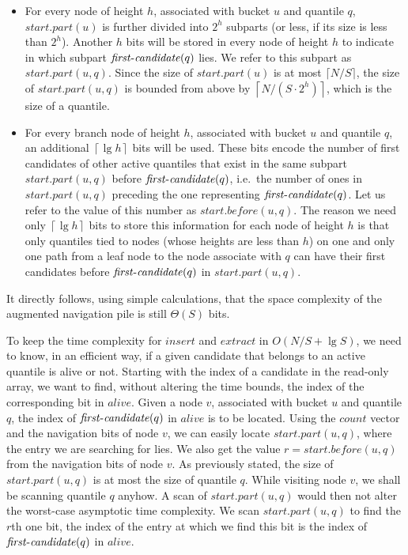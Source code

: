 \documentclass[final,onetabnum,onefignum,onethmnum]{siamltex}
\newcommand{\Insert}{\mbox{$\mathit{insert}$}}
\newcommand{\Extract}{\mbox{$\mathit{extract}$}}
\newcommand{\ceils}[1]{\left\lceil #1 \right\rceil}
\newcommand{\FirstCandidate}{\mbox{$\mathit{first}\mbox{\rm -}\mathit{candidate}$}}
\begin{document}
\begin{itemize}
\item For every node of height $h$, associated with bucket $u$ and
  quantile $q$, $\mathit{start.part}(u)$ is further divided into $2^h$
  subparts (or less, if its size is less than $2^h$). Another $h$ bits
  will be stored in every node of height $h$ to indicate in which
  subpart $\FirstCandidate(q)$ lies. We refer to
  this subpart as $\mathit{start.part}(u,q)$. Since the size of
  $\mathit{start.part}(u)$ is at most $\lceil N/S \rceil$, the size of
  $\mathit{start.part}(u,q)$ is bounded from above by $\ceils{N/(S
    \cdot 2^h)}$, which is the size of a quantile.

\item For every branch node of height $h$, associated with bucket $u$ and
  quantile $q$, an additional $\left\lceil{\lg h}\right\rceil$ bits
  will be used. These bits encode the number of first candidates
  of other active quantiles that exist in the same subpart
  $\mathit{start.part}(u,q)$ before $\FirstCandidate(q)$, 
  i.e.~the number of ones in $\mathit{start.part}(u,q)$
  preceding the one representing $\FirstCandidate(q)$. 
  Let us refer to the value of this number as $\mathit{start.before}(u,q)$.  
	The reason we need only $\left\lceil{\lg h}\right\rceil$ bits to store this
  information for each node of height $h$ is that only quantiles tied
  to nodes (whose heights are less than $h$) on one and only one path
  from a leaf node to the node associate with $q$ can have their first candidates
  before $\FirstCandidate(q)$ in $\mathit{start.part}(u,q)$.
\end{itemize}

It directly follows, using simple calculations, that the space
complexity of the augmented navigation pile is still $\Theta(S)$ bits. 

To keep the time complexity for \Insert{} and \Extract{} in $O(N/S +
\lg S)$, we need to know, in an efficient way, if a given candidate that
belongs to an active quantile is alive or not.  Starting with the
index of a candidate in the read-only array, we want to find, without
altering the time bounds, the index of the corresponding bit in $\mathit{alive}$.
Given a node $v$, associated with bucket $u$ and quantile $q$,
the index of $\FirstCandidate(q)$ in
$\mathit{alive}$ is to be located. Using the $\mathit{count}$ vector
and the navigation bits of node $v$, we can easily locate
$\mathit{start.part}(u,q)$, where the entry we are searching for
lies. We also get the value $r = \mathit{start.before}(u,q)$ from the
navigation bits of node $v$. As previously stated, the size of
$\mathit{start.part}(u,q)$ is at most the size of quantile $q$. While
visiting node $v$, we shall be scanning quantile $q$ anyhow. A scan of
$\mathit{start.part}(u,q)$ would then not alter the worst-case
asymptotic time complexity. We scan $\mathit{start.part}(u,q)$ to find
the $r$th one bit, the index of the entry at which we find this bit is
the index of $\FirstCandidate(q)$ in $\mathit{alive}$.
\end{document}
